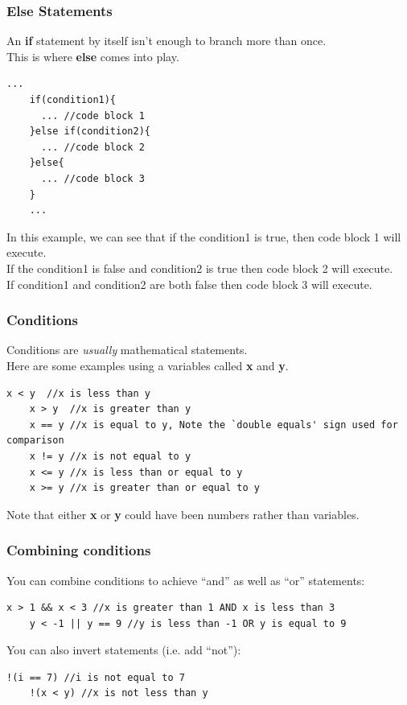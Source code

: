 \documentclass{beamer}
\begin{document}
\begin{frame}[fragile]
  \frametitle{Else Statements}
  An \textbf{if} statement by itself isn't enough to branch more than once.\\
  This is where \textbf{else} comes into play.
  \begin{lstlisting}[style=customc]
    ... 
    if(condition1){
      ... //code block 1
    }else if(condition2){
      ... //code block 2
    }else{
      ... //code block 3
    }
    ...
  \end{lstlisting}
  In this example, we can see that if the condition1 is true, then code block 1 will execute.\\
  If the condition1 is false and condition2 is true then code block 2 will execute.\\
  If condition1 and condition2 are both false then code block 3 will execute.
\end{frame}

\begin{frame}[fragile]
  \frametitle{Conditions}
  Conditions are \textit{usually} mathematical statements.\\
  Here are some examples using a variables called \textbf{x} and \textbf{y}.\\
  \begin{lstlisting}[style=customc]
    x < y  //x is less than y
    x > y  //x is greater than y
    x == y //x is equal to y, Note the `double equals' sign used for comparison
    x != y //x is not equal to y
    x <= y //x is less than or equal to y
    x >= y //x is greater than or equal to y
  \end{lstlisting}
  Note that either \textbf{x} or \textbf{y} could 
  have been numbers rather than variables.
\end{frame}

\begin{frame}[fragile]
  \frametitle{Combining conditions}
  You can combine conditions to achieve ``and'' as well as ``or'' statements:
  \begin{lstlisting}[style=customc]
    x > 1 && x < 3 //x is greater than 1 AND x is less than 3
    y < -1 || y == 9 //y is less than -1 OR y is equal to 9
  \end{lstlisting}
  You can also invert statements (i.e. add ``not''):
  \begin{lstlisting}[style=customc]
    !(i == 7) //i is not equal to 7
    !(x < y) //x is not less than y
  \end{lstlisting}
\end{frame}
\end{document}

